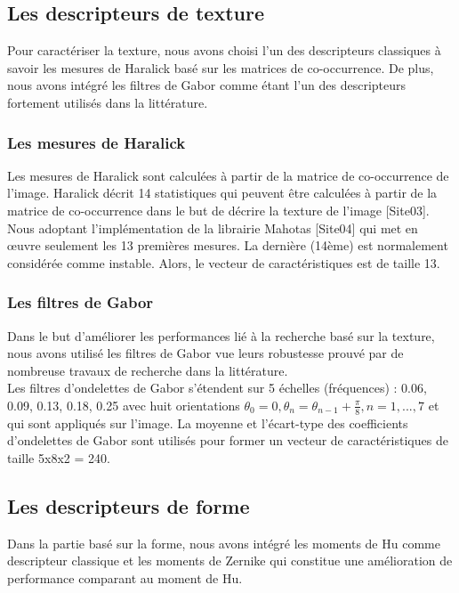 \subsection{Les descripteurs de texture}
Pour caractériser la texture, nous avons choisi l'un des descripteurs classiques à savoir les mesures de Haralick basé sur les matrices de co-occurrence. De plus, nous avons intégré les filtres de Gabor comme étant l'un des descripteurs fortement utilisés dans la littérature.
\subsubsection{Les mesures de Haralick}
Les mesures de Haralick sont calculées à partir de la matrice de co-occurrence de l'image. Haralick décrit 14 statistiques qui peuvent être calculées à partir de la matrice de co-occurrence dans le but de décrire la texture de l'image [Site03]. Nous adoptant l'implémentation de la librairie Mahotas [Site04] qui met en œuvre seulement les 13 premières mesures. La dernière (14ème) est normalement considérée comme instable. Alors, le vecteur de caractéristiques est de taille 13.

\subsubsection{Les filtres de Gabor}
Dans le but d'améliorer les performances lié à la recherche basé sur la texture, nous avons utilisé les filtres de Gabor vue leurs robustesse prouvé par de nombreuse travaux de recherche dans la littérature.\\

Les filtres d'ondelettes de Gabor s'étendent sur 5 échelles (fréquences) : 0.06, 0.09, 0.13, 0.18, 0.25 avec huit orientations $ \theta_0 = 0, \theta_n = \theta_{n-1} + \frac{\pi}{8} , n = 1,...,7$  et qui sont appliqués sur l'image. La moyenne et l'écart-type des coefficients d'ondelettes de Gabor sont utilisés pour former un vecteur de caractéristiques de taille 5x8x2 = 240.

\subsection{Les descripteurs de forme}
Dans la partie basé sur la forme, nous avons intégré les moments de Hu comme descripteur classique et les moments de Zernike qui constitue une amélioration de performance comparant au moment de Hu.

